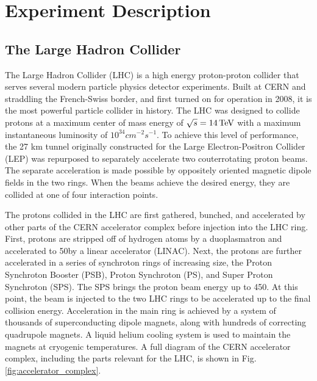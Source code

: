 \chapter{Experiment Description}

\section{The Large Hadron Collider}
The Large Hadron Collider (LHC) is a high energy proton-proton collider that serves several modern particle physics detector experiments. 
Built at CERN and straddling the French-Swiss border, and first turned on for operation in 2008, it is the most powerful particle collider in history. 
The LHC was designed to collide protons at a maximum center of mass energy of $\sqrt s = 14\,\text{Te\hspace{-.08em}V}$ 
with a maximum instantaneous luminosity of $10^{34}cm^{-2}s^{-1}$. To achieve this level of performance, the 27 km tunnel 
originally constructed for the Large Electron-Positron Collider (LEP) was repurposed to separately 
accelerate two couterrotating proton beams. The separate acceleration is made possible by oppositely oriented 
magnetic dipole fields in the two rings. When the beams achieve the desired energy, they are collided at one of four interaction points. 

The protons collided in the LHC are first gathered, bunched, and accelerated by other parts of the CERN accelerator complex before injection into the LHC ring. 
First, protons are stripped off of hydrogen atoms by a duoplasmatron and accelerated to 50\MeV by a linear accelerator (LINAC). Next, the protons are further accelerated 
in a series of synchroton rings of increasing size, the Proton Synchroton Booster (PSB), Proton Synchroton (PS), and Super Proton Synchroton (SPS). The SPS brings the 
proton beam energy up to 450\GeV. At this point, the beam is injected to the two LHC rings to be accelerated up to the final collision energy. Acceleration in the main 
ring is achieved by a system of thousands of superconducting dipole magnets, along with hundreds of correcting quadrupole magnets. A liquid helium cooling system is 
used to maintain the magnets at cryogenic temperatures. A full diagram of the CERN accelerator complex, including the parts relevant for the LHC, is shown in Fig. \ref{fig:accelerator_complex}.

